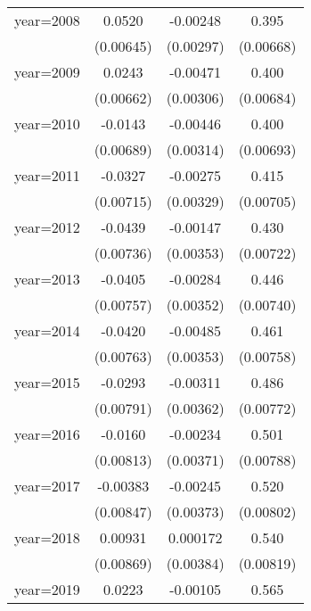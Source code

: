 {\begin{longtable}{l*{3}{c}}
year=2008       &   0.0520\sym{***}& -0.00248         &    0.395\sym{***}\\
                &(0.00645)         &(0.00297)         &(0.00668)         \\
year=2009       &   0.0243\sym{***}& -0.00471         &    0.400\sym{***}\\
                &(0.00662)         &(0.00306)         &(0.00684)         \\
year=2010       &  -0.0143\sym{**} & -0.00446         &    0.400\sym{***}\\
                &(0.00689)         &(0.00314)         &(0.00693)         \\
year=2011       &  -0.0327\sym{***}& -0.00275         &    0.415\sym{***}\\
                &(0.00715)         &(0.00329)         &(0.00705)         \\
year=2012       &  -0.0439\sym{***}& -0.00147         &    0.430\sym{***}\\
                &(0.00736)         &(0.00353)         &(0.00722)         \\
year=2013       &  -0.0405\sym{***}& -0.00284         &    0.446\sym{***}\\
                &(0.00757)         &(0.00352)         &(0.00740)         \\
year=2014       &  -0.0420\sym{***}& -0.00485         &    0.461\sym{***}\\
                &(0.00763)         &(0.00353)         &(0.00758)         \\
year=2015       &  -0.0293\sym{***}& -0.00311         &    0.486\sym{***}\\
                &(0.00791)         &(0.00362)         &(0.00772)         \\
year=2016       &  -0.0160\sym{**} & -0.00234         &    0.501\sym{***}\\
                &(0.00813)         &(0.00371)         &(0.00788)         \\
year=2017       & -0.00383         & -0.00245         &    0.520\sym{***}\\
                &(0.00847)         &(0.00373)         &(0.00802)         \\
year=2018       &  0.00931         & 0.000172         &    0.540\sym{***}\\
                &(0.00869)         &(0.00384)         &(0.00819)         \\
year=2019       &   0.0223\sym{**} & -0.00105         &    0.565\sym{***}\\

\end{longtable}}

